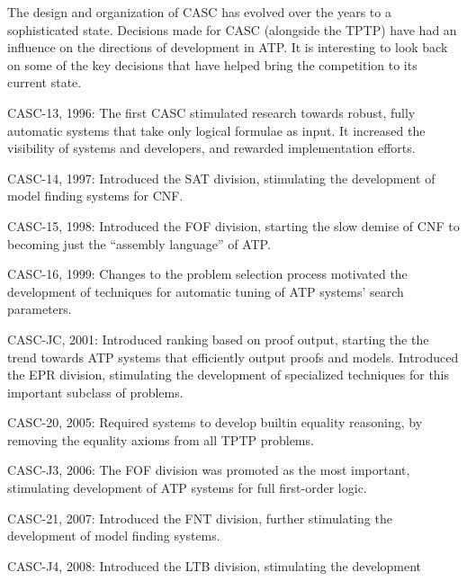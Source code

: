 \documentclass{easychair}
\newenvironment{packed_itemize}{
\vspace*{-0.2em}
\begin{itemize}
\setlength{\partopsep}{0pt}
\setlength{\itemsep}{1pt}
\setlength{\parskip}{0pt}
\setlength{\parsep}{0pt}
}{\end{itemize}}
\begin{document}
The design and organization of CASC has evolved over the years to a 
sophisticated state.
Decisions made for CASC (alongside the TPTP) have had an influence on the 
directions of development in ATP.
It is interesting to look back on some of the key decisions that have helped 
bring the competition to its current state.
\begin{packed_itemize}
\item CASC-13, 1996: The first CASC stimulated research towards robust,
    fully automatic systems that take only logical formulae as input.
    It increased the visibility of systems and developers, and rewarded 
    implementation efforts.
\item CASC-14, 1997: Introduced the SAT division, stimulating the 
    development of model finding systems for CNF.
\item CASC-15, 1998: Introduced the FOF division, starting the slow demise 
    of CNF to becoming just the ``assembly language'' of ATP. 
\item CASC-16, 1999: Changes to the problem selection process motivated the 
    development of techniques for automatic tuning of ATP systems' search
    parameters.
\item CASC-JC, 2001: Introduced ranking based on proof output, starting the
    the trend towards ATP systems that efficiently output proofs and models.
    Introduced the EPR division, stimulating the development of specialized
    techniques for this important subclass of problems.
\item CASC-20, 2005: Required systems to develop builtin equality reasoning,
    by removing the equality axioms from all TPTP  problems.
\item CASC-J3, 2006: The FOF division was promoted as the most important,
    stimulating development of ATP systems for full first-order logic.
\item CASC-21, 2007: Introduced the FNT division, further stimulating the
    development of model finding systems.
\item CASC-J4, 2008: Introduced the LTB division, stimulating the development

\end{packed_itemize}
\end{document}
